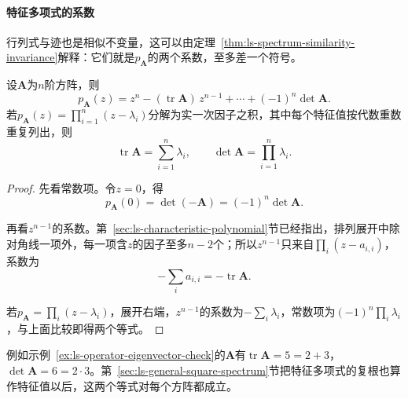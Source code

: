 \paragraph{特征多项式的系数}
行列式与迹也是相似不变量，这可以由定理~\ref{thm:ls-spectrum-similarity-invariance}解释：它们就是$p_{\bm A}$的两个系数，至多差一个符号。
\begin{theorem}[迹、行列式与特征值]
\label{thm:ls-trace-det-eigenvalues}
设$\bm A$为$n$阶方阵，则
\[
 p_{\bm A}(z)=z^n-(\operatorname{tr}\bm A)\,z^{n-1}+\cdots+(-1)^n\det\bm A .
\]
若$p_{\bm A}(z)=\prod_{i=1}^n(z-\lambda_i)$分解为实一次因子之积，其中每个特征值按代数重数重复列出，则
\begin{equation}
 \operatorname{tr}\bm A=\sum_{i=1}^n\lambda_i,\qquad\det\bm A=\prod_{i=1}^n\lambda_i .
 \label{eq:ls-trace-det-eigenvalues}
\end{equation}
\end{theorem}
\begin{proof}
先看常数项。令$z=0$，得
\[
 p_{\bm A}(0)=\det(-\bm A)=(-1)^n\det\bm A .
\]

再看$z^{n-1}$的系数。第~\ref{sec:ls-characteristic-polynomial}节已经指出，排列展开中除对角线一项外，每一项含$z$的因子至多$n-2$个；所以$z^{n-1}$只来自$\prod_i(z-a_{i,i})$，系数为
\[
 -\sum_ia_{i,i}=-\operatorname{tr}\bm A .
\]

若$p_{\bm A}=\prod_i(z-\lambda_i)$，展开右端，$z^{n-1}$的系数为$-\sum_i\lambda_i$，常数项为$(-1)^n\prod_i\lambda_i$，与上面比较即得两个等式。
\end{proof}
例如示例~\ref{ex:ls-operator-eigenvector-check}的$\bm A$有$\operatorname{tr}\bm A=5=2+3$，$\det\bm A=6=2\cdot3$。第~\ref{sec:ls-general-square-spectrum}节把特征多项式的复根也算作特征值以后，这两个等式对每个方阵都成立。

